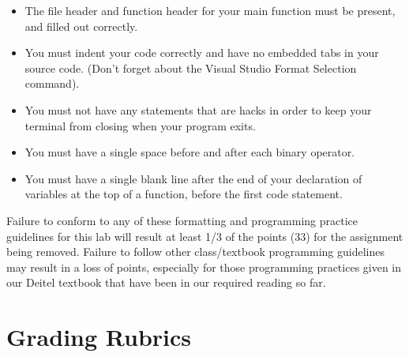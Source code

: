 \documentclass[11pt]{article}
\begin{document}
\begin{itemize}
\item The file header and function header for your main function must be
present, and filled out correctly.
\item You must indent your code correctly and have no embedded tabs in
your source code. (Don't forget about the Visual Studio Format
Selection command).
\item You must not have any statements that are hacks in order to keep
your terminal from closing when your program exits.
\item You must have a single space before and after each binary operator.
\item You must have a single blank line after the end of your declaration
of variables at the top of a function, before the first code
statement.
\end{itemize}

Failure to conform to any of these formatting and programming practice
guidelines for this lab will result at least 1/3 of the points (33)
for the assignment being removed.  Failure to follow other
class/textbook programming guidelines may result in a loss of points,
especially for those programming practices given in our Deitel
textbook that have been in our required reading so far.

\section*{Grading Rubrics}
\label{sec-6}
\end{document}
